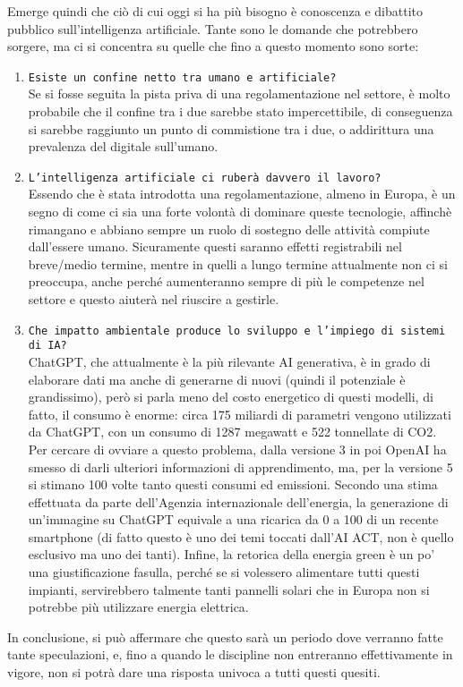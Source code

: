\documentclass{article}
\begin{document}
\begin{justify}
   Emerge quindi che ciò di cui oggi si ha più bisogno è conoscenza e dibattito pubblico sull'intelligenza artificiale. Tante sono le domande che potrebbero sorgere, ma ci si concentra su quelle che fino a questo momento sono sorte:
   \begin{enumerate}
       \item \texttt{Esiste un confine netto tra umano e artificiale?}\\
       Se si fosse seguita la pista priva di una regolamentazione nel settore, è molto probabile che il confine tra i due sarebbe stato impercettibile, di conseguenza si sarebbe raggiunto un punto di commistione tra i due, o addirittura una prevalenza del digitale sull'umano.
       \item \texttt{L’intelligenza artificiale ci ruberà davvero il lavoro?}\\
       Essendo che è stata introdotta una regolamentazione, almeno in Europa, è un segno di come ci sia una forte volontà di dominare queste tecnologie, affinchè rimangano e abbiano sempre un ruolo di sostegno delle attività compiute dall'essere umano. Sicuramente questi saranno effetti registrabili nel breve/medio termine, mentre in quelli a lungo termine attualmente non ci si preoccupa, anche perché aumenteranno sempre di più le competenze nel settore e questo aiuterà nel riuscire a gestirle.
       \item \texttt{Che impatto ambientale produce lo sviluppo e l'impiego di sistemi di IA?}\\
       ChatGPT, che attualmente è la più rilevante AI generativa, è in grado di elaborare dati ma anche di generarne di nuovi (quindi il potenziale è grandissimo), però si parla meno del costo energetico di questi modelli, di fatto, il consumo è enorme: circa 175 miliardi di parametri vengono utilizzati da ChatGPT, con un consumo di 1287 megawatt e 522 tonnellate di CO2. Per cercare di ovviare a questo problema, dalla versione 3 in poi OpenAI ha smesso di darli ulteriori informazioni di apprendimento, ma, per la versione 5 si stimano 100 volte tanto questi consumi ed emissioni.
       Secondo una stima effettuata da parte dell'Agenzia internazionale dell'energia, la generazione di un’immagine su ChatGPT equivale a una ricarica da 0 a 100 di un recente smartphone (di fatto questo è uno dei temi toccati dall’AI ACT, non è quello esclusivo ma uno dei tanti).
       Infine, la retorica della energia green è un po’ una giustificazione fasulla, perché se si volessero alimentare tutti questi impianti, servirebbero talmente tanti pannelli solari che in Europa non si potrebbe più utilizzare energia elettrica.\citep{nast_se_2023}
   \end{enumerate}
   In conclusione, si può affermare che questo sarà un periodo dove verranno fatte tante speculazioni, e, fino a quando le discipline non entreranno effettivamente in vigore, non si potrà dare una risposta univoca a tutti questi quesiti.
\end{justify}

\begin{justify}
    
    
\end{justify}
\end{document}
